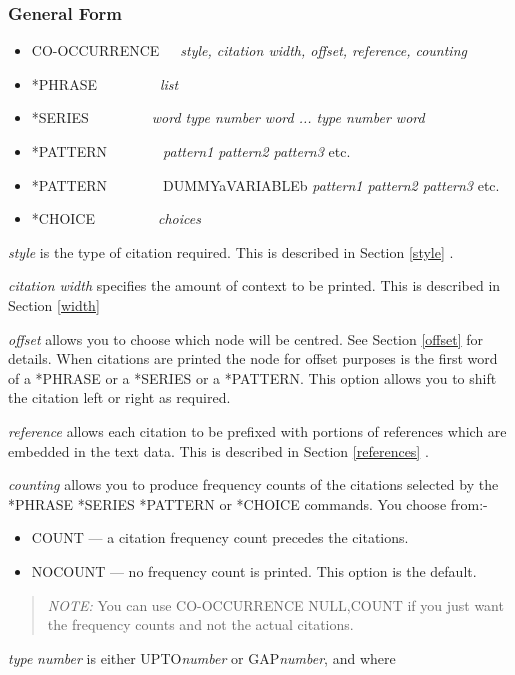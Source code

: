 \subsubsection{General Form}
\begin{itemize}
\item CO-OCCURRENCE~~~{\em style, citation width, offset, reference, counting}
\item *PHRASE~~~~~~~~~{\em list}
\item *SERIES~~~~~~~~~{\em word type number word ... type number word}
\item *PATTERN~~~~~~~~{\em pattern1 pattern2 pattern3} etc.
\item *PATTERN~~~~~~~~DUMMYaVARIABLEb {\em pattern1 pattern2 pattern3} etc.
\item *CHOICE~~~~~~~~~{\em choices}
\end{itemize}

{\em style} is the type of citation required. This is described in
Section \ref{style} .

{\em citation width} specifies the amount of context to be printed.
This is described in Section \ref{width}

{\em offset} allows you to choose which node will be centred. See Section
\ref{offset} for details.
When citations are printed the node for offset purposes is the first word
of a *PHRASE or a *SERIES or a *PATTERN. This option allows you to
shift the citation left or right as required.

{\em reference} allows each citation to be prefixed with portions of references
which are embedded in the text data. This is described in Section \ref{references} .

{\em counting} allows you to produce frequency counts of the citations selected
    by the *PHRASE *SERIES *PATTERN or *CHOICE commands. You choose from:-
\begin{itemize}
\item COUNT --- a citation frequency count precedes the citations.
\item NOCOUNT --- no frequency count is printed. This option is the default.
\end{itemize}
\begin{quote}
{\em NOTE:} You can use CO-OCCURRENCE  NULL,COUNT if you just want the
  frequency counts and not the actual citations.
\end{quote}

{\em type} {\em number} is either UPTO{\em number} or GAP{\em number}, and where

